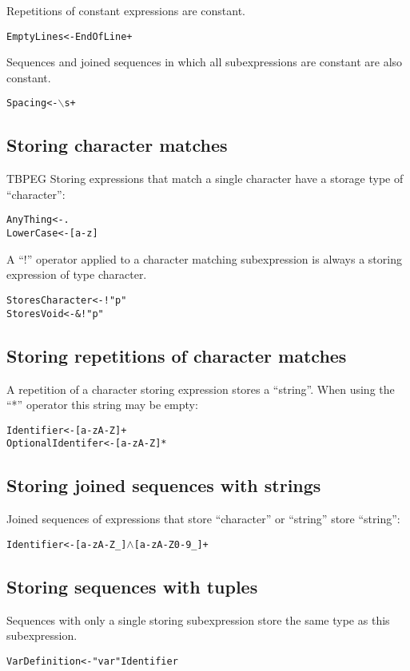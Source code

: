 \documentclass[a4paper,11pt]{article}
\begin{document}
Repetitions of constant expressions are constant.
\begin{alltt}
    EmptyLines <- EndOfLine+
\end{alltt}

Sequences and joined sequences in which all subexpressions are constant are also constant.
\begin{alltt}
    Spacing <- \(\backslash\)s+
\end{alltt}

\subsection{Storing character matches}
TBPEG Storing expressions that match a single character have a storage type of ``character'':
\begin{alltt}
    AnyThing  <- .
    LowerCase <- [a-z]
\end{alltt}

A ``!'' operator applied to a character matching subexpression is always a storing expression of type character.
\begin{alltt}
    StoresCharacter <- ! "p"
    StoresVoid      <- \&! "p"
\end{alltt}

\subsection{Storing repetitions of character matches}
A repetition of a character storing expression stores a ``string''.
When using the ``*'' operator this string may be empty:
\begin{alltt}
    Identifier        <- [a-zA-Z]+
    OptionalIdentifer <- [a-zA-Z]*
\end{alltt}

\subsection{Storing joined sequences with strings}
Joined sequences of expressions that store ``character'' or ``string'' store ``string'':
\begin{alltt}
    Identifier <- [a-zA-Z\_] \(\wedge\) [a-zA-Z0-9\_]+
\end{alltt}

\subsection{Storing sequences with tuples}
Sequences with only a single storing subexpression store the same type as this subexpression.
\begin{alltt}
    VarDefinition <- "var" Identifier
\end{alltt}
\end{document}

